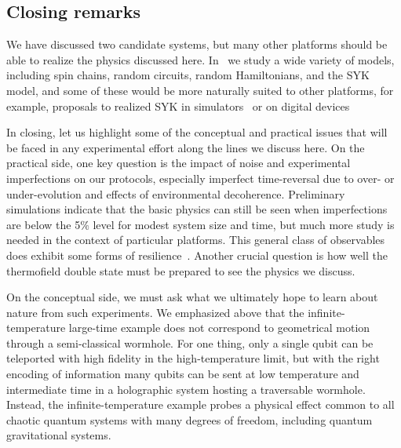 \documentclass[aps,pra,reprint,floatfix,superscriptaddress, nofootinbib,longbibliography,onecolumn,notitlepage,12pt, tightenlines]{revtex4-1}
\begin{document}
\subsection{Closing remarks}

We have discussed two candidate systems, but many other platforms should be able to realize the physics discussed here. In~\cite{longpaper} we study a wide variety of models, including spin chains, random circuits, random Hamiltonians, and the SYK model, and some of these would be more naturally suited to other platforms, for example, proposals to realized SYK in simulators~\cite{Danshita_2017,Pikulin_2017} or on digital devices~\cite{Garc_a_lvarez_2017,Babbush_2019}

In closing, let us highlight some of the conceptual and practical issues that will be faced in any experimental effort along the lines we discuss here. On the practical side, one key question is the impact of noise and experimental imperfections on our protocols, especially imperfect time-reversal due to over- or under-evolution and effects of environmental decoherence. Preliminary simulations indicate that the basic physics can still be seen when imperfections are below the 5$\%$ level for modest system size and time, but much more study is needed in the context of particular platforms. This general class of observables does exhibit some forms of resilience~\cite{Swingle_2018}. Another crucial question is how well the thermofield double state must be prepared to see the physics we discuss.

On the conceptual side, we must ask what we ultimately hope to learn about nature from such experiments. We emphasized above that the infinite-temperature large-time example does not correspond to geometrical motion through a semi-classical wormhole. For one thing, only a single qubit can be teleported with high fidelity in the high-temperature limit, but with the right encoding of information many qubits can be sent at low temperature and intermediate time in a holographic system hosting a traversable wormhole. Instead, the infinite-temperature example probes a physical effect common to all chaotic quantum systems with many degrees of freedom, including quantum gravitational systems.
\end{document}
